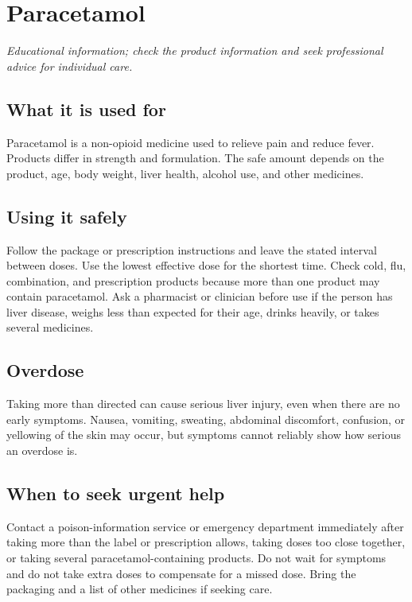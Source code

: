 \chapter{Paracetamol}

\medskip
\noindent\textit{Educational information; check the product information and seek professional advice for individual care.}

\section*{What it is used for}
Paracetamol is a non-opioid medicine used to relieve pain and reduce fever. Products differ in strength and formulation. The safe amount depends on the product, age, body weight, liver health, alcohol use, and other medicines.

\section*{Using it safely}
Follow the package or prescription instructions and leave the stated interval between doses. Use the lowest effective dose for the shortest time. Check cold, flu, combination, and prescription products because more than one product may contain paracetamol. Ask a pharmacist or clinician before use if the person has liver disease, weighs less than expected for their age, drinks heavily, or takes several medicines.

\section*{Overdose}
Taking more than directed can cause serious liver injury, even when there are no early symptoms. Nausea, vomiting, sweating, abdominal discomfort, confusion, or yellowing of the skin may occur, but symptoms cannot reliably show how serious an overdose is.

\section*{When to seek urgent help}
Contact a poison-information service or emergency department immediately after taking more than the label or prescription allows, taking doses too close together, or taking several paracetamol-containing products. Do not wait for symptoms and do not take extra doses to compensate for a missed dose. Bring the packaging and a list of other medicines if seeking care.

